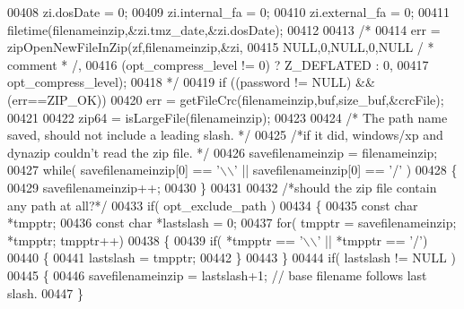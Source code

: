 \begin{DoxyCode}
{{{{{{{00408                 zi.dosDate = 0;
00409                 zi.internal\_fa = 0;
00410                 zi.external\_fa = 0;
00411                 filetime(filenameinzip,&zi.tmz\_date,&zi.dosDate);
00412 
00413 \textcolor{comment}{/*}
00414 \textcolor{comment}{                err = zipOpenNewFileInZip(zf,filenameinzip,&zi,}
00415 \textcolor{comment}{                                 NULL,0,NULL,0,NULL / * comment * /,}
00416 \textcolor{comment}{                                 (opt\_compress\_level != 0) ? Z\_DEFLATED : 0,}
00417 \textcolor{comment}{                                 opt\_compress\_level);}
00418 \textcolor{comment}{*/}
00419                 \textcolor{keywordflow}{if} ((password != NULL) && (err==ZIP\_OK))
00420                     err = getFileCrc(filenameinzip,buf,size\_buf,&crcFile);
00421 
00422                 zip64 = isLargeFile(filenameinzip);
00423 
00424                                                          \textcolor{comment}{/* The path name saved, should not include a
       leading slash. */}
00425                \textcolor{comment}{/*if it did, windows/xp and dynazip couldn't read the zip file. */}
00426                  savefilenameinzip = filenameinzip;
00427                  \textcolor{keywordflow}{while}( savefilenameinzip[0] == \textcolor{charliteral}{'\(\backslash\)\(\backslash\)'} || savefilenameinzip[0] == \textcolor{charliteral}{'/'} )
00428                  \{
00429                      savefilenameinzip++;
00430                  \}
00431 
00432                  \textcolor{comment}{/*should the zip file contain any path at all?*/}
00433                  \textcolor{keywordflow}{if}( opt\_exclude\_path )
00434                  \{
00435                      \textcolor{keyword}{const} \textcolor{keywordtype}{char} *tmpptr;
00436                      \textcolor{keyword}{const} \textcolor{keywordtype}{char} *lastslash = 0;
00437                      \textcolor{keywordflow}{for}( tmpptr = savefilenameinzip; *tmpptr; tmpptr++)
00438                      \{
00439                          \textcolor{keywordflow}{if}( *tmpptr == \textcolor{charliteral}{'\(\backslash\)\(\backslash\)'} || *tmpptr == \textcolor{charliteral}{'/'})
00440                          \{
00441                              lastslash = tmpptr;
00442                          \}
00443                      \}
00444                      \textcolor{keywordflow}{if}( lastslash != NULL )
00445                      \{
00446                          savefilenameinzip = lastslash+1; \textcolor{comment}{// base filename follows last slash.}
00447                      \}
}}}}}}}
\end{DoxyCode}
